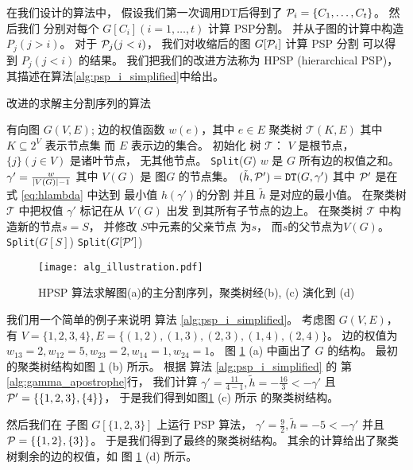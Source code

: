 在我们设计的算法中，
假设我们第一次调用DT后得到了
$\P_i = \{C_1, \dots, C_t\}$。
然后我们 分别对每个
$G[C_i](i=1,\dots, t)$
计算 PSP分割。
并从子图的计算中构造 $P_j(j>i)$。
对于 $\P_j(j<i)$，
我们对收缩后的图 $G[\P_i]$ 计算 PSP 分割
可以得到  $P_j(j<i)$ 的结果。
我们把我们的改进方法称为 HPSP (hierarchical PSP)，
其描述在算法\ref{alg:psp_i_simplified}中给出。

\begin{algorithm}[!ht]
	\caption{改进的求解主分割序列的算法}\label{alg:psp_i_simplified}
	\begin{algorithmic}[1]
		\REQUIRE 有向图 $G(V, E)$; 边的权值函数 $w(e)$，其中 $e\in E$
		\ENSURE 聚类树 $\mathcal{T}(K, E)$ 其中 $K \subseteq 2^{V}$ 表示节点集
    而 $E$ 表示边的集合。
		\STATE 初始化 树 $\mathcal{T}$：
     $V$ 是根节点，
     $\{j\}(j \in V)$ 是诸叶节点，
     无其他节点。
		\STATE \texttt{Split}($G$)
		\STATE $w$ 是 $G$ 所有边的权值之和。
		\STATE $\gamma' = \frac{w}{\abs{V(G)}-1}$
    其中 $V(G)$ 是 图$G$
    的节点集。
    \label{alg:gamma_apostrophe}
		\STATE $(\tilde{h}, \P')
    = \texttt{DT}(G, \gamma')$ 其中
    $\P'$ 是在 式 \eqref{eq:hlambda} 中达到
    最小值 $h(\gamma')$的分割
    并且 $\tilde{h}$ 是对应的最小值。 \label{line:DT}
		\STATE 在聚类树
    $\mathcal{T}$ 中把权值 $\gamma'$ 标记在从 $V(G)$ 出发
    到其所有子节点的边上。
		\ELSE
		\STATE 在聚类树
    $\mathcal{T}$ 中构造新的节点$s=S$，
    并修改 $S$中元素的父亲节点 为$s$，
    而$s$的父节点为$V(G)$。
		\STATE \texttt{Split}($G[S]$) \label{line:SplitDown}
		\ENDFOR 
		\STATE \texttt{Split}($G[\P']$)		\label{line:SplitUp}
		\ENDIF
		\ENDFUNCTION
	\end{algorithmic}
\end{algorithm}

\begin{figure}[!ht]
	\centering
	\texttt{[image: alg\_illustration.pdf]}
	\caption{HPSP 算法求解图(a)的主分割序列，聚类树经(b), (c) 演化到 (d) }\label{fig:alg_eg}
\end{figure}

\begin{example}
	我们用一个简单的例子来说明
  算法 \ref{alg:psp_i_simplified}。
  考虑图 $G(V, E)$，有 $V=\{1,2,3,4\}, E=\{(1,2),(1,3),(2,3),(1,4),(2,4)\}$。
  边的权值为 $w_{13}=2, w_{12}=5, w_{23}=2, w_{14}=1, w_{24}=1$。
	图 \ref{fig:alg_eg} (a) 中画出了 $G$
  的结构。
  最初的聚类树结构如图 \ref{fig:alg_eg} (b)
  所示。
  根据 
  算法 \ref{alg:psp_i_simplified} 的
  第\ref {alg:gamma_apostrophe}行，
  我们计算 $\gamma' = \frac{11}{4-1}, \tilde{h} = -\frac{16}{3} < -\gamma' $
  且 $\P' = \{\{1,2,3\},\{4\}\}$，
  于是我们得到如图\ref{fig:alg_eg} (c) 所示
  的聚类树结构。
	
	然后我们在 子图 $G[\{1,2,3\}]$ 上运行 PSP 算法，
  $\gamma' = \frac{9}{2}, \tilde{h} = -5 < -\gamma'$
  并且 $\P= \{\{1,2\},\{3\}\}$。 
  于是我们得到了最终的聚类树结构。
  其余的计算给出了聚类树剩余的边的权值，如
  图 \ref{fig:alg_eg} (d) 所示。
\end{example}	
